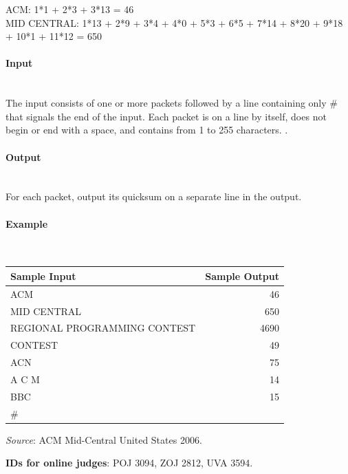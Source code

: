 \documentclass{article}
\begin{document}
ACM: 1*1 + 2*3 + 3*13 = 46 \\

MID CENTRAL: 1*13 + 2*9 + 3*4 + 4*0 + 5*3 + 6*5 + 7*14 + 8*20 + 9*18 + 10*1 + 11*12 = 650

\paragraph{Input} \mbox{} \\

The input consists of one or more packets followed by a line containing only \# that signals the end of the input. Each packet is on a line by itself, does not begin or end with a space, and contains from 1 to 255 characters.
.

\paragraph{Output}\mbox{} \\

For each packet, output its quicksum on a separate line in the output.

\paragraph{Example}\mbox{} \\

\begin{table}[h]
    \centering
    \begin{tabular}{|l|r|}
        \hline
        \textbf{Sample Input} & \textbf{Sample Output} \\
        \hline
        ACM   &  46  \\ 
        MID CENTRAL  & 650 \\ 
        REGIONAL PROGRAMMING CONTEST & 4690 \\ 
        CONTEST    & 49 \\ 
        ACN    &  75 \\ 
        A C M    &  14\\ 
        BBC     &   15  \\
        $\#$& \\ \hline
    \end{tabular}
\end{table}

\textit{Source}: ACM Mid-Central United States 2006.

\textbf{IDs for online judges}: POJ 3094, ZOJ 2812, UVA 3594.
\end{document}
